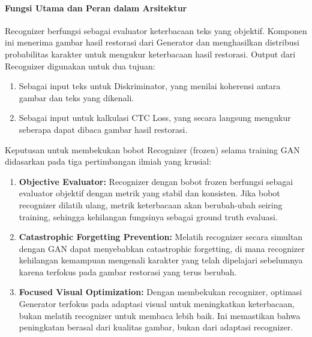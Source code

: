\documentclass[12pt,a4paper]{article}
\begin{document}
\paragraph{Fungsi Utama dan Peran dalam Arsitektur}

Recognizer berfungsi sebagai evaluator keterbacaan teks yang objektif. Komponen ini menerima gambar hasil restorasi dari Generator dan menghasilkan distribusi probabilitas karakter untuk mengukur keterbacaan hasil restorasi. Output dari Recognizer digunakan untuk dua tujuan:

\begin{enumerate}[nosep]
    \item Sebagai input teks untuk Diskriminator, yang menilai koherensi antara gambar dan teks yang dikenali.
    \item Sebagai input untuk kalkulasi CTC Loss, yang secara langsung mengukur seberapa dapat dibaca gambar hasil restorasi.
\end{enumerate}


Keputusan untuk membekukan bobot Recognizer (frozen) selama training GAN didasarkan pada tiga pertimbangan ilmiah yang krusial:

\begin{enumerate}[nosep]
    \item \textbf{Objective Evaluator:} Recognizer dengan bobot frozen berfungsi sebagai evaluator objektif dengan metrik yang stabil dan konsisten. Jika bobot recognizer dilatih ulang, metrik keterbacaan akan berubah-ubah seiring training, sehingga kehilangan fungsinya sebagai ground truth evaluasi.
    
    \item \textbf{Catastrophic Forgetting Prevention:} Melatih recognizer secara simultan dengan GAN dapat menyebabkan catastrophic forgetting, di mana recognizer kehilangan kemampuan mengenali karakter yang telah dipelajari sebelumnya karena terfokus pada gambar restorasi yang terus berubah.
    
    \item \textbf{Focused Visual Optimization:} Dengan membekukan recognizer, optimasi Generator terfokus pada adaptasi visual untuk meningkatkan keterbacaan, bukan melatih recognizer untuk membaca lebih baik. Ini memastikan bahwa peningkatan berasal dari kualitas gambar, bukan dari adaptasi recognizer.
\end{enumerate}
\end{document}
